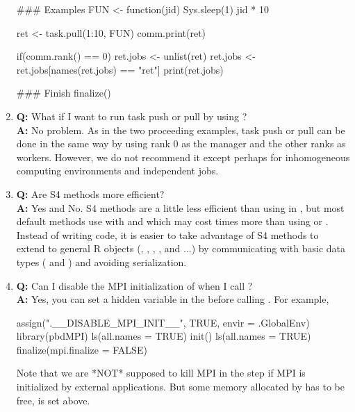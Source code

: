 \begin{enumerate}
\begin{Code}[title=SPMD R Script (task\_pull)]
### Examples
FUN <- function(jid){
  Sys.sleep(1)
  jid * 10
}

ret <- task.pull(1:10, FUN)
comm.print(ret)

if(comm.rank() == 0){
  ret.jobs <- unlist(ret)
  ret.jobs <- ret.jobs[names(ret.jobs) == "ret"]
  print(ret.jobs)
}

### Finish
finalize()
\end{Code}


\item {\bf\color{blue} Q:}
      What if I want to run task push or pull by using ? \\
      {\bf\color{blue} A:}
      No problem. As in the two proceeding examples, task push or pull
      can be done in the same way by using rank 0 as the manager and
      the other ranks as workers. However, we do not recommend it
      except perhaps for inhomogeneous computing environments and
      independent jobs.

\item {\bf\color{blue} Q:}
      Are S4 methods more efficient? \\
      {\bf\color{blue} A:}
      Yes and No. S4 methods are a little less efficient than using
       in , but most default
      methods use  with  and 
      which may cost  times more than using
       or .
      Instead of writing  code, it is easier to take
      advantage of S4 methods to extend to general R objects (,
      , , , and  ...)
      by communicating with basic data types
      ( and ) and avoiding serialization.

\item {\bf\color{blue} Q:}
      Can I disable the MPI initialization of  when I call
      ? \\
      {\bf\color{blue} A:}
      Yes, you can set a hidden variable  in the
       before calling .
      For example,
\begin{Code}[title=SPMD R Script]
assign(".__DISABLE_MPI_INIT__", TRUE, envir = .GlobalEnv)
library(pbdMPI)
ls(all.names = TRUE)
init()
ls(all.names = TRUE)
finalize(mpi.finalize = FALSE)
\end{Code}
      Note that we are *NOT* supposed to kill MPI in the  step
      if MPI is initialized by external applications. But some memory allocated
      by  has to be free,  is set above.


\end{enumerate}
